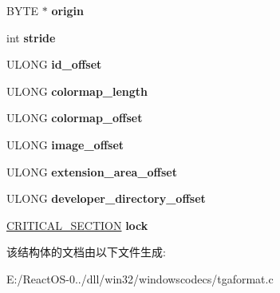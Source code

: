 \begin{DoxyCompactItemize}
\mbox{\label{struct_tga_decoder_a215ccb22772a58ed16072d233ec0eac8}} 
B\+Y\+TE $\ast$ {\bfseries origin}
\item 
\mbox{\label{struct_tga_decoder_a8946cd62f1b4b244c2fa849dbe2c5960}} 
int {\bfseries stride}
\item 
\mbox{\label{struct_tga_decoder_a33844dab4bc05d0af8bdd50256a3177a}} 
U\+L\+O\+NG {\bfseries id\+\_\+offset}
\item 
\mbox{\label{struct_tga_decoder_aa7666c7948e37b254b7d821def73d259}} 
U\+L\+O\+NG {\bfseries colormap\+\_\+length}
\item 
\mbox{\label{struct_tga_decoder_a62502b99431144b2d3246fc312e7e64a}} 
U\+L\+O\+NG {\bfseries colormap\+\_\+offset}
\item 
\mbox{\label{struct_tga_decoder_a3512d280c5a4f8255f5f5bbf1f4e8178}} 
U\+L\+O\+NG {\bfseries image\+\_\+offset}
\item 
\mbox{\label{struct_tga_decoder_a62bebbe4f61253f72187084faf8d7f2c}} 
U\+L\+O\+NG {\bfseries extension\+\_\+area\+\_\+offset}
\item 
\mbox{\label{struct_tga_decoder_a513fb2fd0c4350421481716f5d92494b}} 
U\+L\+O\+NG {\bfseries developer\+\_\+directory\+\_\+offset}
\item 
\mbox{\label{struct_tga_decoder_a819005807ce5c7716a3869cb907c3a18}} 
\hyperlink{struct___c_r_i_t_i_c_a_l___s_e_c_t_i_o_n}{C\+R\+I\+T\+I\+C\+A\+L\+\_\+\+S\+E\+C\+T\+I\+ON} {\bfseries lock}
\end{DoxyCompactItemize}


该结构体的文档由以下文件生成\+:\begin{DoxyCompactItemize}
\item 
E\+:/\+React\+O\+S-\/0../dll/win32/windowscodecs/tgaformat.\+c\end{DoxyCompactItemize}
